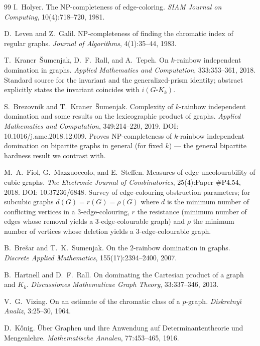 \documentclass[11pt,a4paper]{article}
\theoremstyle{plain}
\theoremstyle{definition}
\begin{document}
\begin{thebibliography}{99}
I.~Holyer.
The NP-completeness of edge-coloring.
\textit{SIAM Journal on Computing}, 10(4):718--720, 1981.

D.~Leven and Z.~Galil.
NP-completeness of finding the chromatic index of regular graphs.
\textit{Journal of Algorithms}, 4(1):35--44, 1983.

T.~Kraner~\v{S}umenjak, D.~F.~Rall, and A.~Tepeh.
On $k$-rainbow independent domination in graphs.
\textit{Applied Mathematics and Computation}, 333:353--361, 2018.
Standard source for the invariant and the generalized-prism identity; abstract explicitly states the invariant coincides with $i(G\square K_{k})$.

S.~Brezovnik and T.~Kraner~\v{S}umenjak.
Complexity of $k$-rainbow independent domination and some results on the lexicographic product of graphs.
\textit{Applied Mathematics and Computation}, 349:214--220, 2019.
DOI: 10.1016/j.amc.2018.12.009.
Proves NP-completeness of $k$-rainbow independent domination on bipartite graphs in general (for fixed $k$) --- the general bipartite hardness result we contrast with.

M.~A.~Fiol, G.~Mazzuoccolo, and E.~Steffen.
Measures of edge-uncolourability of cubic graphs.
\textit{The Electronic Journal of Combinatorics}, 25(4):Paper \#P4.54, 2018.
DOI: 10.37236/6848.
Survey of edge-colouring obstruction parameters; for subcubic graphs $d(G)=r(G)=\rho(G)$ where $d$ is the minimum number of conflicting vertices in a $3$-edge-colouring, $r$ the resistance (minimum number of edges whose removal yields a $3$-edge-colourable graph) and $\rho$ the minimum number of vertices whose deletion yields a $3$-edge-colourable graph.

B.~Bre\v{s}ar and T.~K.~Sumenjak.
On the $2$-rainbow domination in graphs.
\textit{Discrete Applied Mathematics}, 155(17):2394--2400, 2007.

B.~Hartnell and D.~F.~Rall.
On dominating the Cartesian product of a graph and $K_{k}$.
\textit{Discussiones Mathematicae Graph Theory}, 33:337--346, 2013.

V.~G.~Vizing.
On an estimate of the chromatic class of a $p$-graph.
\textit{Diskretny\u{\i} Analiz}, 3:25--30, 1964.

D.~K\H{o}nig.
\"Uber Graphen und ihre Anwendung auf Determinantentheorie und Mengenlehre.
\textit{Mathematische Annalen}, 77:453--465, 1916.

\end{thebibliography}
\end{document}
